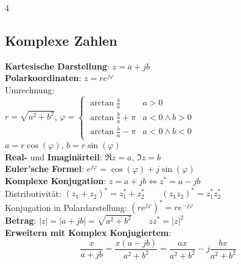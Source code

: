 \documentclass[fs, footer]{latex4ei}
\begin{document}
\begin{multicols*}{4}
{        \subsection{Komplexe Zahlen}
        \textbf{Kartesische Darstellung}: $z = a + j b$\\
        \textbf{Polarkoordinaten}: $z = r  e^{j \varphi}$\\

        Umrechnung:\\
        $r = \sqrt{a^2 + b^2}$, $\varphi = \begin{cases}
                \arctan\frac{b}{a}     & a>0 \\
                \arctan\frac{b}{a}+\pi & a<0 \wedge b>0 \\
                \arctan\frac{b}{a}-\pi & a<0 \wedge b<0
            \end{cases}$\\
        $a = r  \cos(\varphi)$, $b = r  \sin(\varphi)$\\

        \textbf{Real-} und \textbf{Imaginärteil}: $\Re z = a$, $\Im z = b$\\

        \textbf{Euler'sche Formel}: $e^{j \varphi} = \cos(\varphi) + j \sin(\varphi)$\\

        \textbf{Komplexe Konjugation}: $z = a + jb \iff z^* = a - j b$\\
        Distributivität: $(z_1+z_2)^*=z_1^*+z_2^*\qquad (z_1z_2)^*=z_1^*z_2^*$\\
        Konjugation in Polardarstellung: $(r e^{j\varphi})^* = r e^{-j\varphi}$\\

        \textbf{Betrag}: $|z| = |a+jb| = \sqrt{a^2+b^2}\qquad zz^* = |z|^2$\\

        \textbf{Erweitern mit Komplex Konjugiertem}:\\
        \[
            \frac{x}{a+jb} = \frac{x(a-jb)}{a^2+b^2} = \frac{ax}{a^2+b^2} - j\frac{bx}{a^2+b^2}
        \]
    }


\end{multicols*}
\end{document}
